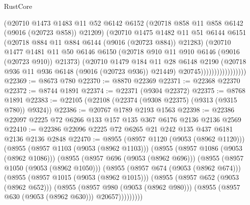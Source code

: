 \begin{lexlean}{RustCore}
\begin{coremodule}
                              (@20710
                                @1473
                                @1483
                                @11
                                @52
                                @6142
                                @6152
                                (@20718 @858 @11 @858 @6142 (@9016 (@20723 @858)) @21209)
                                (@20710
                                  @1475
                                  @1482
                                  @11
                                  @51
                                  @6144
                                  @6151
                                  (@20718 @884 @11 @884 @6144 (@9016 (@20723 @884)) @21283)
                                  (@20710
                                    @1477
                                    @1481
                                    @11
                                    @50
                                    @6146
                                    @6150
                                    (@20718 @910 @11 @910 @6146 (@9016 (@20723 @910)) @21373)
                                    (@20710
                                      @1479
                                      @184
                                      @11
                                      @28
                                      @6148
                                      @2190
                                      (@20718 @936 @11 @936 @6148 (@9016 (@20723 @936)) @21449)
                                      @20745)))))))))))))))))
@22369 := @8673 @780
@22370 := @8870 @22369
@22371 := @22368 @22370
@22372 := @8744 @1891
@22374 := @22371 (@9304 @22372)
@22375 := @8768 @1891
@22383 := @22105 (@22108 (@22374 (@9308 @22375) (@9313 (@9315 @780)) @9324))
@22386 := @20767 @1789 @2193 @1563
@22398 := @22386 @22097 @2225 @72 @6266 @133 @157 @135 @367 @6176 @2136 @2136 @2569
@22410 := @22386 @22096 @2225 @72 @6265 @21 @242 @135 @437 @6181 @2136 @2136 @2848
@22470 := @8955
    (@8957 @1120 (@9053 (@8962 @1120)))
    (@8955
      (@8957 @1103 (@9053 (@8962 @1103)))
      (@8955
        (@8957 @1086 (@9053 (@8962 @1086)))
        (@8955
          (@8957 @696 (@9053 (@8962 @696)))
          (@8955
            (@8957 @1050 (@9053 (@8962 @1050)))
            (@8955
              (@8957 @674 (@9053 (@8962 @674)))
              (@8955
                (@8957 @1015 (@9053 (@8962 @1015)))
                (@8955
                  (@8957 @652 (@9053 (@8962 @652)))
                  (@8955
                    (@8957 @980 (@9053 (@8962 @980)))
                    (@8955 (@8957 @630 (@9053 (@8962 @630))) @20657)))))))))

\end{coremodule}
\end{lexlean}
